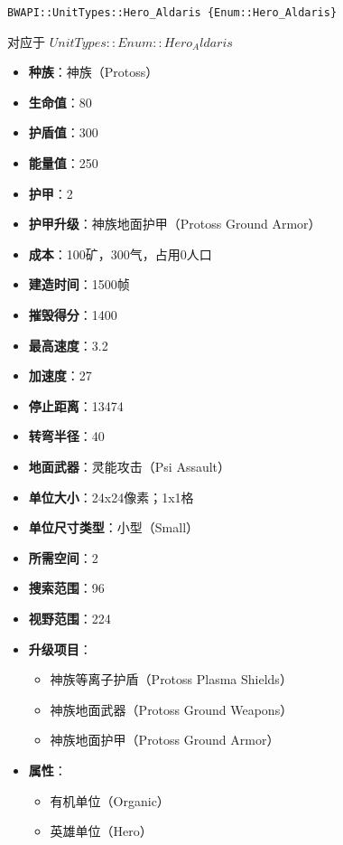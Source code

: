 \begin{tcolorbox}[colback=white, colframe=black!60!white, title=Hero\_Aldaris(), arc=0mm]
    \begin{verbatim}
BWAPI::UnitTypes::Hero_Aldaris {Enum::Hero_Aldaris}
    \end{verbatim}
    对应于  $ UnitTypes::Enum::Hero_Aldaris $ 
    \begin{itemize}
        \item \textbf{种族}：神族（Protoss）
        \item \textbf{生命值}：80
        \item \textbf{护盾值}：300
        \item \textbf{能量值}：250
        \item \textbf{护甲}：2
        \item \textbf{护甲升级}：神族地面护甲（Protoss Ground Armor）
        \item \textbf{成本}：100矿，300气，占用0人口
        \item \textbf{建造时间}：1500帧
        \item \textbf{摧毁得分}：1400
        \item \textbf{最高速度}：3.2
        \item \textbf{加速度}：27
        \item \textbf{停止距离}：13474
        \item \textbf{转弯半径}：40
        \item \textbf{地面武器}：灵能攻击（Psi Assault）
        \item \textbf{单位大小}：24x24像素；1x1格
        \item \textbf{单位尺寸类型}：小型（Small）
        \item \textbf{所需空间}：2
        \item \textbf{搜索范围}：96
        \item \textbf{视野范围}：224
        \item \textbf{升级项目}：
            \begin{itemize}
                \item 神族等离子护盾（Protoss Plasma Shields）
                \item 神族地面武器（Protoss Ground Weapons）
                \item 神族地面护甲（Protoss Ground Armor）
            \end{itemize}
        \item \textbf{属性}：
            \begin{itemize}
                \item 有机单位（Organic）
                \item 英雄单位（Hero）
            \end{itemize}
    \end{itemize}
\end{tcolorbox}

